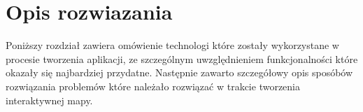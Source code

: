 \chapter{Opis rozwiazania}
\label{cha:problem}

Poniższy rozdział zawiera omówienie technologi które zostały wykorzystane w procesie tworzenia aplikacji, ze szczególnym uwzględnieniem funkcjonalności które okazały się najbardziej przydatne. Następnie zawarto szczegółowy opis sposóbów rozwiązania problemów które należało rozwiązać w trakcie tworzenia interaktywnej mapy.
